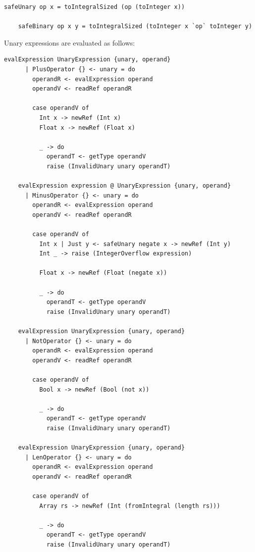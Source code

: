 \documentclass[UdineBachThesis,american,11pt]{PhdThesis}
\begin{document}
  \begin{lstlisting}[gobble=4,basicstyle=\ttfamily\small]
    safeUnary op x = toIntegralSized (op (toInteger x))

    safeBinary op x y = toIntegralSized (toInteger x `op` toInteger y)
  \end{lstlisting}

  Unary expressions are evaluated as follows:

  \newpage

  \begin{lstlisting}[gobble=4,basicstyle=\ttfamily\small]
    evalExpression UnaryExpression {unary, operand}
      | PlusOperator {} <- unary = do
        operandR <- evalExpression operand
        operandV <- readRef operandR

        case operandV of
          Int x -> newRef (Int x)
          Float x -> newRef (Float x)

          _ -> do
            operandT <- getType operandV
            raise (InvalidUnary unary operandT)

    evalExpression expression @ UnaryExpression {unary, operand}
      | MinusOperator {} <- unary = do
        operandR <- evalExpression operand
        operandV <- readRef operandR

        case operandV of
          Int x | Just y <- safeUnary negate x -> newRef (Int y)
          Int _ -> raise (IntegerOverflow expression)

          Float x -> newRef (Float (negate x))

          _ -> do
            operandT <- getType operandV
            raise (InvalidUnary unary operandT)

    evalExpression UnaryExpression {unary, operand}
      | NotOperator {} <- unary = do
        operandR <- evalExpression operand
        operandV <- readRef operandR

        case operandV of
          Bool x -> newRef (Bool (not x))

          _ -> do
            operandT <- getType operandV
            raise (InvalidUnary unary operandT)

    evalExpression UnaryExpression {unary, operand}
      | LenOperator {} <- unary = do
        operandR <- evalExpression operand
        operandV <- readRef operandR

        case operandV of
          Array rs -> newRef (Int (fromIntegral (length rs)))

          _ -> do
            operandT <- getType operandV
            raise (InvalidUnary unary operandT)
  \end{lstlisting}
\end{document}
